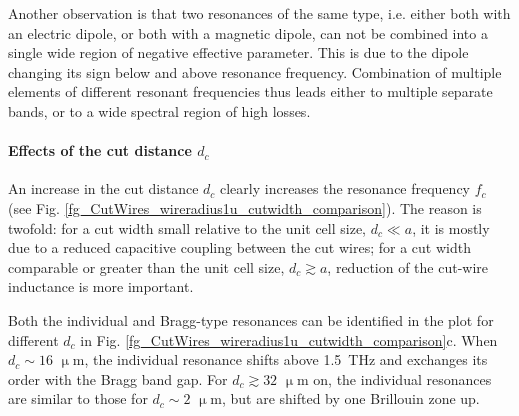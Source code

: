 Another observation is that two resonances of the same type, i.e. either both with an electric dipole, or both with a magnetic dipole, can not be combined into a single wide region of negative effective parameter. This is due to the dipole changing its sign below and above resonance frequency. Combination of multiple elements of different resonant frequencies thus leads either to multiple separate bands, or to a wide spectral region of high losses.


\paragraph{Effects of the cut distance $d_c$}%
An increase in the cut distance $d_c$ clearly increases the resonance frequency $f_c$ (see Fig. \ref{fg_CutWires_wireradius1u_cutwidth_comparison}). The reason is twofold: for a cut width small relative to the unit cell size, $d_c\ll a$, it is mostly due to a reduced capacitive coupling between the cut wires; for a cut width comparable or greater than the unit cell size, $d_c \gtrsim a$, reduction of the cut-wire inductance is more important.

Both the individual and Bragg-type resonances can be identified in the plot for different $d_c$ in Fig. \ref{fg_CutWires_wireradius1u_cutwidth_comparison}c. When $d_c \sim 16$  $\upmu$m, the individual resonance shifts above 1.5~THz and exchanges its order with the Bragg band gap. 
For $d_c \gtrsim 32$  $\upmu$m on, the individual resonances are similar to those for $d_c\sim 2$ $\upmu$m, but are shifted by one Brillouin zone up.


